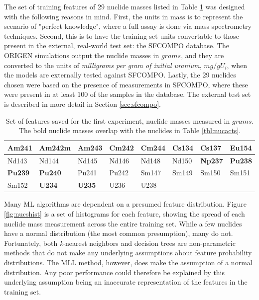 The set of training features of 29 nuclide masses listed in Table
\ref{tbl:nucmass} was designed with the following reasons in mind.  First, the
units in mass is to represent the scenario of "perfect knowledge", where a full
assay is done via mass spectrometry techniques.  Second, this is to have the
training set units convertable to those present in the external, real-world
test set: the \gls{SFCOMPO} database.  The \gls{ORIGEN} simulations output the
nuclide masses in $grams$, and they are converted to the units of
\textit{milligrams per gram of initial uranium}, $mg/gU_i$, when the models are
externally tested against \gls{SFCOMPO}. Lastly, the 29 nuclides chosen were
based on the presence of measurements in \gls{SFCOMPO}, where these were
present in at least 100 of the samples in the database.  The external test set
is described in more detail in Section \ref{sec:sfcompo}.

\begin{table}[!htb]
  \centering
  \begin{tabular}{@{}|l|l|l|l|l|l|l|l|@{}}
    \hline
    \textbf{Am241}&Am242m        &\textbf{Am243}&Cm242&\textbf{Cm244}&\textbf{Cs134}&\textbf{Cs137}&\textbf{Eu154} \\ \hline
    Nd143         &Nd144         &Nd145         &Nd146&Nd148         &Nd150         &\textbf{Np237}&\textbf{Pu238} \\ \hline
    \textbf{Pu239}&\textbf{Pu240}&Pu241         &Pu242&Sm147         &Sm149         &Sm150         &Sm151          \\ \hline
    Sm152         &\textbf{U234} &\textbf{U235} &U236 &U238          &              &              &               \\ \hline
  \end{tabular}
  \caption{Set of features saved for the first experiment, nuclide masses 
           measured in $grams$. The bold nuclide masses overlap with the 
           nuclides in Table \ref{tbl:nucacts}.}
  \label{tbl:nucmass}
\end{table}

Many \gls{ML} algorithms are dependent on a presumed feature distribution.
Figure \ref{fig:nucshist} is a set of histograms for each feature, showing the
spread of each nuclide mass measurement across the entire training set.  While
a few nuclides have a normal distribution (the most common presumption), many
do not. Fortunately, both \textit{k}-nearest neighbors and decision trees are
non-parametric methods that do not make any underlying assumptions about
feature probability distributions. The \gls{MLL} method, however, does make the
assumption of a normal distribution. Any poor performance could therefore be
explained by this underlying assumption being an inaccurate representation of
the features in the training set.

